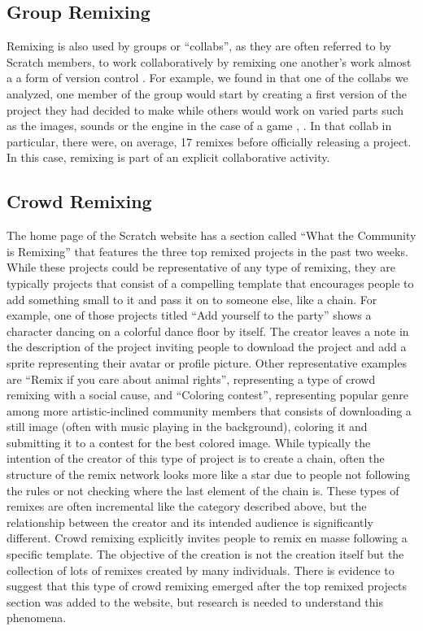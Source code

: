 \subsection{Group Remixing}
Remixing is also used by groups or ``collabs'', as they are often referred to by Scratch members, to work collaboratively by remixing one another's work almost a a form of version control \citep{tichy_rcs_1985}.
For example, we found in that one of the collabs we analyzed, one member of the group would start by creating a first version of the project they had decided to make while others would work on varied parts such as the images, sounds or the engine in the case of a game \citep{aragon_tale_2009}, .
In that collab in particular, there were, on average, 17 remixes before officially releasing a project.
In this case, remixing is part of an explicit collaborative activity.


\subsection{Crowd Remixing}
The home page of the Scratch website has a section called ``What the Community is Remixing''  that features the three top remixed projects in the past two weeks.
While these projects could be representative of any type of remixing, they are typically projects that consist of a compelling template that encourages people to add something small to it and pass it on to someone else, like a chain.
For example, one of those projects titled ``Add yourself to the party'' shows a character dancing on a colorful dance floor by itself.
The creator leaves a note in the description of the project inviting people to download the project and add a sprite representing their avatar or profile picture.
Other representative examples are ``Remix if you care about animal rights'', representing a type of crowd remixing with a social cause, and ``Coloring contest'', representing popular genre among more artistic-inclined community members that consists of downloading a still image (often with music playing in the background), coloring it and submitting it to a contest for the best colored image.
While typically the intention of the creator of this type of project is to create a chain, often the structure of the remix network looks more like a star due to people not following the rules or not checking where the last element of the chain is.
These types of remixes are often incremental like the category described above, but the relationship between the creator and its intended audience is significantly different. 
Crowd remixing explicitly invites people to remix en masse following a specific template. 
The objective of the creation is not the creation itself but the collection of lots of remixes created by many individuals.
There is evidence to suggest that this type of crowd remixing emerged after the top remixed projects section was added to the website, but research is needed to understand this phenomena.

